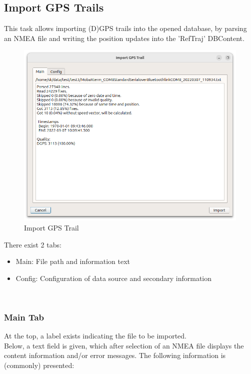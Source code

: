 \subsection{Import GPS Trails}
\label{sec:ui_import_gps}

This task allows importing (D)GPS trails into the opened database, by parsing an NMEA file and writing the position updates into the 'RefTraj' DBContent.

\begin{figure}[H]
  \center
    \includegraphics[width=16cm]{figures/gps_import_task.png}
  \caption{Import GPS Trail}
\end{figure}

There exist 2 tabs:

\begin{itemize}
\item Main: File path and information text
\item Config: Configuration of data source and secondary information
\end{itemize}
\ \\

\subsubsection{Main Tab}

At the top, a label exists indicating the file to be imported. \\

Below, a text field is given, which after selection of an NMEA file displays the content information and/or error messages. The following information is (commonly) presented:

